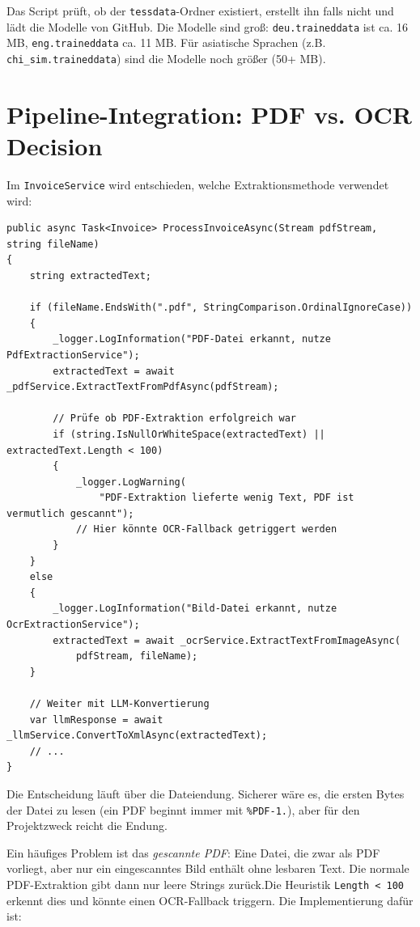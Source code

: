 Das Script prüft, ob der \texttt{tessdata}-Ordner existiert, erstellt ihn falls nicht und lädt die Modelle von GitHub. Die Modelle sind groß: \texttt{deu.traineddata} ist ca. 16 MB, \texttt{eng.traineddata} ca. 11 MB. Für asiatische Sprachen (z.B. \texttt{chi\_sim.traineddata}) sind die Modelle noch größer (50+ MB).

\section{Pipeline-Integration: PDF vs. OCR Decision}
\label{sec:pipeline_decision}

Im \texttt{InvoiceService} wird entschieden, welche Extraktionsmethode verwendet wird:

\begin{lstlisting}[language={[Sharp]C}, caption={Extraktion-Decision-Logic}, label={lst:extraction_decision}]
public async Task<Invoice> ProcessInvoiceAsync(Stream pdfStream, string fileName)
{
    string extractedText;

    if (fileName.EndsWith(".pdf", StringComparison.OrdinalIgnoreCase))
    {
        _logger.LogInformation("PDF-Datei erkannt, nutze PdfExtractionService");
        extractedText = await _pdfService.ExtractTextFromPdfAsync(pdfStream);
        
        // Prüfe ob PDF-Extraktion erfolgreich war
        if (string.IsNullOrWhiteSpace(extractedText) || extractedText.Length < 100)
        {
            _logger.LogWarning(
                "PDF-Extraktion lieferte wenig Text, PDF ist vermutlich gescannt");
            // Hier könnte OCR-Fallback getriggert werden
        }
    }
    else
    {
        _logger.LogInformation("Bild-Datei erkannt, nutze OcrExtractionService");
        extractedText = await _ocrService.ExtractTextFromImageAsync(
            pdfStream, fileName);
    }

    // Weiter mit LLM-Konvertierung
    var llmResponse = await _llmService.ConvertToXmlAsync(extractedText);
    // ...
}
\end{lstlisting}

Die Entscheidung läuft über die Dateiendung. Sicherer wäre es, die ersten Bytes der Datei zu lesen (ein PDF beginnt immer mit \texttt{\%PDF-1.}), aber für den Projektzweck reicht die Endung.

Ein häufiges Problem ist das \textit{gescannte PDF}: Eine Datei, die zwar als PDF vorliegt, aber nur ein eingescanntes Bild enthält ohne lesbaren Text. Die normale PDF-Extraktion gibt dann nur leere Strings zurück.Die Heuristik \texttt{Length < 100} erkennt dies und könnte einen OCR-Fallback triggern. Die Implementierung dafür ist:

